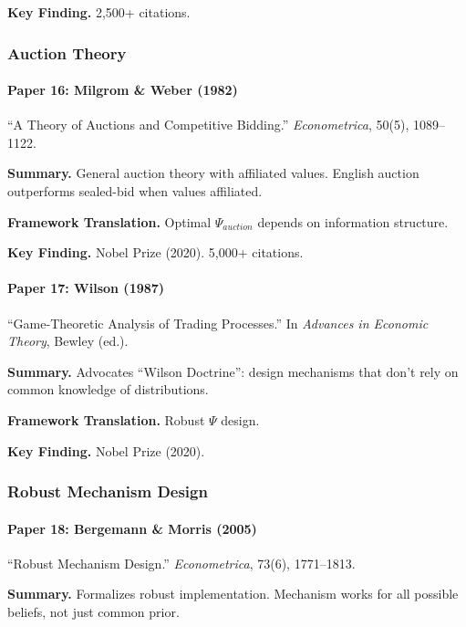 \textbf{Key Finding.}
2,500+ citations.

\subsubsection{Auction Theory}

\paragraph{Paper 16: Milgrom \& Weber (1982)}

``A Theory of Auctions and Competitive Bidding.''
\textit{Econometrica}, 50(5), 1089--1122.

\textbf{Summary.}
General auction theory with affiliated values. English auction outperforms 
sealed-bid when values affiliated.

\textbf{Framework Translation.}
Optimal $\Psi_{auction}$ depends on information structure.

\textbf{Key Finding.}
Nobel Prize (2020). 5,000+ citations.

\paragraph{Paper 17: Wilson (1987)}

``Game-Theoretic Analysis of Trading Processes.''
In \textit{Advances in Economic Theory}, Bewley (ed.).

\textbf{Summary.}
Advocates ``Wilson Doctrine'': design mechanisms that don't rely on 
common knowledge of distributions.

\textbf{Framework Translation.}
Robust $\Psi$ design.

\textbf{Key Finding.}
Nobel Prize (2020).

\subsubsection{Robust Mechanism Design}

\paragraph{Paper 18: Bergemann \& Morris (2005)}

``Robust Mechanism Design.''
\textit{Econometrica}, 73(6), 1771--1813.

\textbf{Summary.}
Formalizes robust implementation. Mechanism works for all possible 
beliefs, not just common prior.


